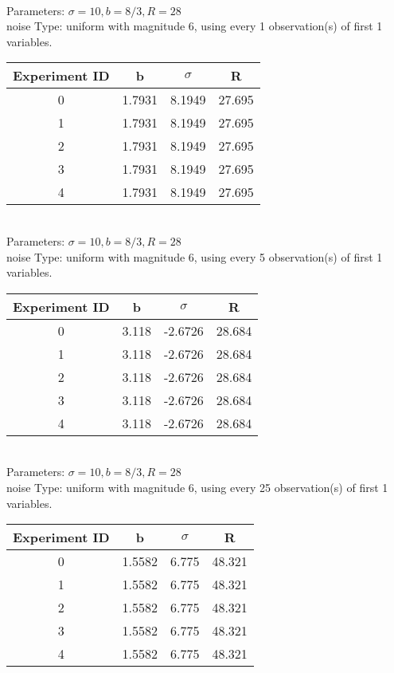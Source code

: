 \begin{multicols}{3}
\begin{tabular}{cccc}
 \end{tabular}\\
Parameters: $\sigma=10, b=8/3, R=28$\\
noise Type: uniform with magnitude 6, using every 1 observation(s) of first 1 variables.\\
\begin{tabular}{cccc}
\hline Experiment ID & b & $\sigma$ & R \\ \hline 
0 & 1.7931 & 8.1949 & 27.695\\ \hline 
 1 & 1.7931 & 8.1949 & 27.695\\ \hline 
 2 & 1.7931 & 8.1949 & 27.695\\ \hline 
 3 & 1.7931 & 8.1949 & 27.695\\ \hline 
 4 & 1.7931 & 8.1949 & 27.695\\ \hline 
 \end{tabular}\\
Parameters: $\sigma=10, b=8/3, R=28$\\
noise Type: uniform with magnitude 6, using every 5 observation(s) of first 1 variables.\\
\begin{tabular}{cccc}
\hline Experiment ID & b & $\sigma$ & R \\ \hline 
0 & 3.118 & -2.6726 & 28.684\\ \hline 
 1 & 3.118 & -2.6726 & 28.684\\ \hline 
 2 & 3.118 & -2.6726 & 28.684\\ \hline 
 3 & 3.118 & -2.6726 & 28.684\\ \hline 
 4 & 3.118 & -2.6726 & 28.684\\ \hline 
 \end{tabular}\\
Parameters: $\sigma=10, b=8/3, R=28$\\
noise Type: uniform with magnitude 6, using every 25 observation(s) of first 1 variables.\\
\begin{tabular}{cccc}
\hline Experiment ID & b & $\sigma$ & R \\ \hline 
0 & 1.5582 & 6.775 & 48.321\\ \hline 
 1 & 1.5582 & 6.775 & 48.321\\ \hline 
 2 & 1.5582 & 6.775 & 48.321\\ \hline 
 3 & 1.5582 & 6.775 & 48.321\\ \hline 
 4 & 1.5582 & 6.775 & 48.321\\ \hline 
 \end{tabular}\\

\end{multicols}

